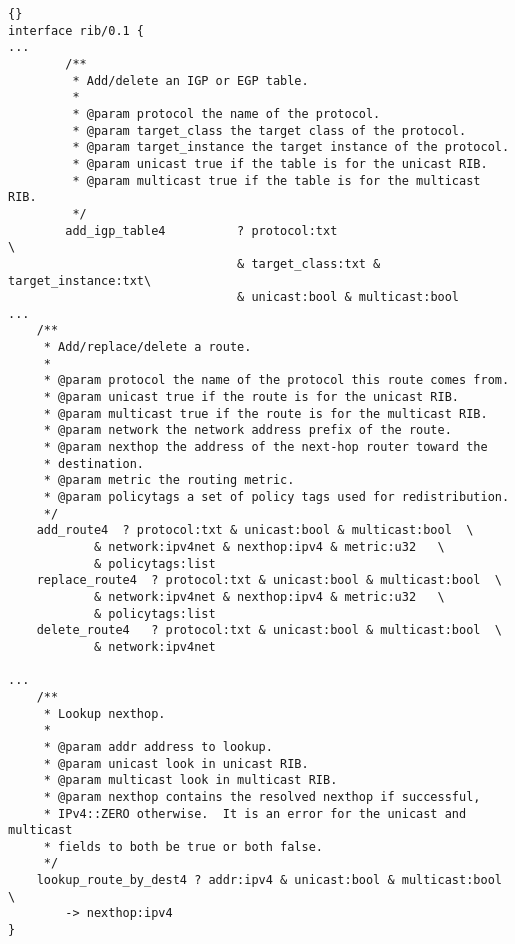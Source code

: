 \documentclass[11pt]{article}
\begin{document}
\newpage

\begin{lstlisting}[caption={Extracts from {\stt xorp/xrl/interfaces/rib.xif} %
                                     \label{lst:rib.xif} } ]{}
interface rib/0.1 {
...
        /**
         * Add/delete an IGP or EGP table.
         *
         * @param protocol the name of the protocol.
         * @param target_class the target class of the protocol.
         * @param target_instance the target instance of the protocol.
         * @param unicast true if the table is for the unicast RIB.
         * @param multicast true if the table is for the multicast RIB.
         */
        add_igp_table4          ? protocol:txt                          \
                                & target_class:txt & target_instance:txt\
                                & unicast:bool & multicast:bool
...
	/**
	 * Add/replace/delete a route.
	 *
	 * @param protocol the name of the protocol this route comes from.
	 * @param unicast true if the route is for the unicast RIB.
	 * @param multicast true if the route is for the multicast RIB.
	 * @param network the network address prefix of the route.
	 * @param nexthop the address of the next-hop router toward the
	 * destination.
	 * @param metric the routing metric.
	 * @param policytags a set of policy tags used for redistribution.
	 */
	add_route4	? protocol:txt & unicast:bool & multicast:bool	\
			& network:ipv4net & nexthop:ipv4 & metric:u32   \
			& policytags:list
	replace_route4	? protocol:txt & unicast:bool & multicast:bool	\
			& network:ipv4net & nexthop:ipv4 & metric:u32   \
			& policytags:list
	delete_route4	? protocol:txt & unicast:bool & multicast:bool	\
			& network:ipv4net

...
	/**
	 * Lookup nexthop.
	 *
	 * @param addr address to lookup.
	 * @param unicast look in unicast RIB.
	 * @param multicast look in multicast RIB.
	 * @param nexthop contains the resolved nexthop if successful,
	 * IPv4::ZERO otherwise.  It is an error for the unicast and multicast
	 * fields to both be true or both false.
	 */
	lookup_route_by_dest4 ? addr:ipv4 & unicast:bool & multicast:bool \
		-> nexthop:ipv4
}
\end{lstlisting}

\newpage
\end{document}

